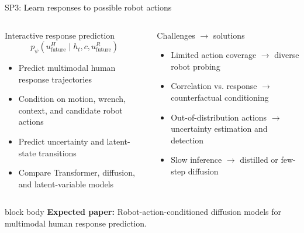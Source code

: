 \documentclass[aspectratio=169,11pt]{beamer}
\newcommand{\paperout}[1]{%
  \begin{beamercolorbox}[rounded=true,sep=0.55em,wd=\linewidth]{block body}
    \footnotesize\textbf{Expected paper:} #1
  \end{beamercolorbox}}
\begin{document}
\begin{frame}[shrink=8]{SP3: Learn responses to possible robot actions}
\footnotesize
\begin{columns}[T,onlytextwidth]
\begin{block}{Interactive response prediction}
\[
p_\psi(u^H_{\mathrm{future}}\mid h_t,c,u^R_{\mathrm{future}})
\]
\begin{itemize}
  \item Predict multimodal human response trajectories
  \item Condition on motion, wrench, context, and candidate robot actions
  \item Predict uncertainty and latent-state transitions
  \item Compare Transformer, diffusion, and latent-variable models
\end{itemize}
\end{block}
\begin{alertblock}{Challenges $\rightarrow$ solutions}
\begin{itemize}
  \item Limited action coverage $\rightarrow$ diverse robot probing
  \item Correlation vs. response $\rightarrow$ counterfactual conditioning
  \item Out-of-distribution actions $\rightarrow$ uncertainty estimation and detection
  \item Slow inference $\rightarrow$ distilled or few-step diffusion
\end{itemize}
\end{alertblock}
\end{columns}
\vspace{0.15cm}
\paperout{Robot-action-conditioned diffusion models for multimodal human response prediction.}
\end{frame}
\end{document}
